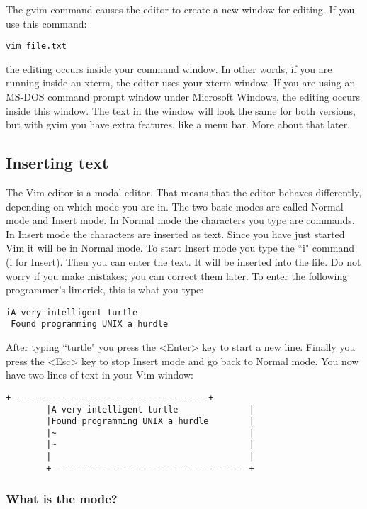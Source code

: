 The gvim command causes the editor to create a new window for editing.
If you use this command:

 \begin{Verbatim}[samepage=true]
 vim file.txt
 \end{Verbatim}

the editing occurs inside your command window.
In other words, if you are running inside an xterm, the editor uses your xterm window.
If you are using an MS-DOS command prompt window under Microsoft Windows, the editing occurs inside this window.
The text in the window will look the same for both versions, but with gvim you have extra features, like a menu bar.
More about that later.

\subsection{Inserting text}
The Vim editor is a modal editor.
That means that the editor behaves differently, depending on which mode you are in.
The two basic modes are called Normal mode and Insert mode.
In Normal mode the characters you type are commands.
In Insert mode the characters are inserted as text.
Since you have just started Vim it will be in Normal mode.
To start Insert mode you type the ``i" command (i for Insert).
Then you can enter the text.
It will be inserted into the file.
Do not worry if you make mistakes; you can correct them later.
To enter the following programmer's limerick, this is what you type:

 \begin{Verbatim}[samepage=true]
 iA very intelligent turtle
 Found programming UNIX a hurdle
 \end{Verbatim}

After typing ``turtle" you press the <Enter> key to start a new line.
Finally you press the <Esc> key to stop Insert mode and go back to Normal mode.
You now have two lines of text in your Vim window: 

		\begin{Verbatim}[samepage=true]
		+---------------------------------------+
		|A very intelligent turtle              |
		|Found programming UNIX a hurdle        |
		|~                                      |
		|~                                      |
		|                                       |
		+---------------------------------------+
		\end{Verbatim}

\subsubsection{What is the mode?}

